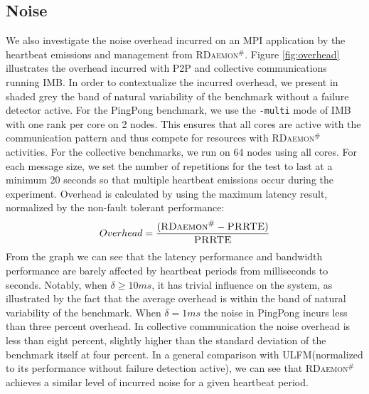 \documentclass[sigconf]{acmart}
\newcommand{\prrte}[0]{\textsc{PRRTE}\xspace}
\newcommand{\ulfm}[0]{\textsc{ULFM}\xspace}
\newcommand{\ourwork}[0]{\textsc{RDaemon}\ensuremath{^\#}\xspace}
\newcommand{\imb}[0]{\textsc{IMB}\xspace}
\begin{document}
\subsection{Noise}
We also investigate the noise overhead incurred on an MPI application by the heartbeat emissions
and management from \ourwork.
Figure \ref{fig:overhead} illustrates the overhead incurred with P2P and collective communications running \imb.
In order to contextualize the incurred overhead, we present in shaded grey the band of natural variability
of the benchmark without a failure detector active.
For the PingPong benchmark, we use the \texttt{-multi} mode of IMB with one rank per core on 2 nodes.
This ensures that all cores are active with the communication pattern and thus
compete for resources with \ourwork activities.
For the collective benchmarks, we run on 64 nodes using all cores. For each message size, we set the number of
repetitions for the test to last at a minimum 20 seconds so that multiple heartbeat emissions occur during the experiment. Overhead is calculated by using the maximum latency result, normalized by the non-fault tolerant performance:
\begin{equation}
Overhead = \frac{( {\ourwork - \prrte} )}{\prrte}
\end{equation}
 From the graph we can see that the latency performance and bandwidth performance are barely affected by heartbeat periods from milliseconds to seconds. Notably, when $ \delta \geq 10 ms $, it has trivial influence on the system, as illustrated by the fact that the average overhead is within the band of natural variability of the benchmark. When  $ \delta = 1 ms $ the noise in PingPong incurs less than three percent overhead. In collective communication the noise overhead is less than eight percent, slightly higher than the standard deviation of the benchmark itself at four percent.
 In a general comparison with \ulfm (normalized to its performance without failure detection active),
 we can see that \ourwork achieves a similar level of incurred noise for a given
 heartbeat period.
\end{document}
